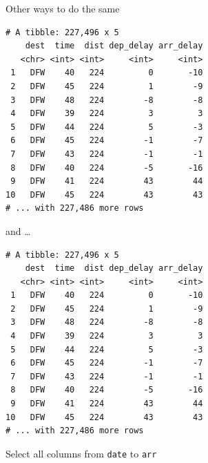 \documentclass[]{article}
\newenvironment{Shaded}{\begin{snugshade}}{\end{snugshade}}
\newcommand{\KeywordTok}[1]{\textcolor[rgb]{0.13,0.29,0.53}{\textbf{{#1}}}}
\newcommand{\StringTok}[1]{\textcolor[rgb]{0.31,0.60,0.02}{{#1}}}
\newcommand{\NormalTok}[1]{{#1}}
\theoremstyle{definition}
\theoremstyle{definition}
\theoremstyle{definition}
\theoremstyle{remark}
\begin{document}
Other ways to do the same

\begin{Shaded}
\end{Shaded}

\begin{verbatim}
# A tibble: 227,496 x 5
    dest  time  dist dep_delay arr_delay
   <chr> <int> <int>     <int>     <int>
 1   DFW    40   224         0       -10
 2   DFW    45   224         1        -9
 3   DFW    48   224        -8        -8
 4   DFW    39   224         3         3
 5   DFW    44   224         5        -3
 6   DFW    45   224        -1        -7
 7   DFW    43   224        -1        -1
 8   DFW    40   224        -5       -16
 9   DFW    41   224        43        44
10   DFW    45   224        43        43
# ... with 227,486 more rows
\end{verbatim}

and \ldots{}

\begin{Shaded}
\end{Shaded}

\begin{verbatim}
# A tibble: 227,496 x 5
    dest  time  dist dep_delay arr_delay
   <chr> <int> <int>     <int>     <int>
 1   DFW    40   224         0       -10
 2   DFW    45   224         1        -9
 3   DFW    48   224        -8        -8
 4   DFW    39   224         3         3
 5   DFW    44   224         5        -3
 6   DFW    45   224        -1        -7
 7   DFW    43   224        -1        -1
 8   DFW    40   224        -5       -16
 9   DFW    41   224        43        44
10   DFW    45   224        43        43
# ... with 227,486 more rows
\end{verbatim}

Select all columns from \texttt{date} to \texttt{arr}

\begin{Shaded}
\end{Shaded}
\end{document}
